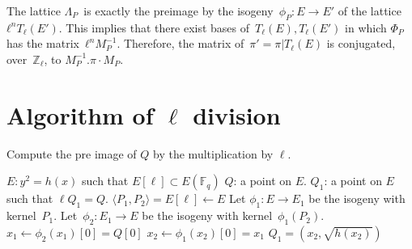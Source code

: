 \documentclass{lms}
\begin{document}
The lattice $Λ_P$~is exactly the preimage
by the isogeny~$ϕ_P: E → E'$ of the lattice~$ℓ^n T_ℓ(E')$.
This implies that there exist bases of~$T_ℓ(E), T_ℓ(E')$
in which $Φ_P$ has the matrix~$ℓ^n M_P^{-1}$.
Therefore, the matrix of~$π' = π|T_ℓ(E)$
is conjugated, over~$ℤ_ℓ$, to $M_P^{-1} . π · M_P$.

\section{Algorithm of $\ell$ division}
\begin{algorithm}
\caption{\label{ldivision}Compute the pre image of $Q$ by the multiplication by $\ell$.}
\begin{algorithmic}[5]
\REQUIRE  $E: y^2=h(x)$ such that $E[\ell] \subset E(\mathbb{F}_q)$ %
\STATE $Q$: a point on $E$.
\ENSURE $Q_1$: a point on $E$ such that $\ell Q_1 = Q$.
\STATE $ \langle P_1,P_2 \rangle = E[\ell] \gets E $
\STATE Let $\phi_1: E → E_1$ be the isogeny with kernel~$P_1$.
\STATE Let~$\phi_2: E_1 → E$ be the isogeny with kernel~$\phi_1(P_2)$.
\STATE $x_1 \gets \phi_2(x_1)[0]=Q[0] $
\STATE $x_2 \gets \phi_1(x_2)[0]=x_1  $
\RETURN $Q_1 =(x_2,\sqrt{h(x_2)})$
\end{algorithmic}
\end{algorithm}
\end{document}
